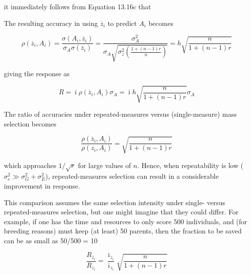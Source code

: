 \documentclass{article}
\begin{document}
it immediately follows from Equation 13.16c that

The resulting accuracy in using  $ \overline{z}_{i} $ to predict  $ A_{i} $ becomes

\begin{equation}
\rho(\overline{z}_{i},A_{i})=\frac{\sigma(A_{i},\overline{z}_{i})}{\sigma_{A}\sigma(\overline{z}_{i})}=\frac{\sigma_{A}^{2}}{\sigma_{A}\sqrt{\sigma_{z}^{2}\left(\frac{1+(n-1)r}{n}\right)}}=h\sqrt{\frac{n}{1+(n-1)r}}
\tag{13.18a}
\label{eq:13_18a}
\end{equation}

giving the response as

\begin{equation}
R=\bar{\imath}\rho(\overline{z}_{i},A_{i})\sigma_{A}=\bar{\imath}h\sqrt{\frac{n}{1+(n-1)r}}\sigma_{A}
\tag{13.18b}
\label{eq:13_18b}
\end{equation}

The ratio of accuracies under repeated-measures versus (single-measure) mass selection becomes

\begin{equation}
\frac{\rho(\overline{z}_{i},A_{i})}{\rho(z_{i},A_{i})}=\sqrt{\frac{n}{1+(n-1)r}}
\tag{13.19a}
\label{eq:13_19a}
\end{equation}

which approaches  $ 1/\sqrt{r} $ for large values of  $ n $. Hence, when repeatability is low ( $ \sigma_e^2 \gg \sigma_G^2 + \sigma_E^2 $), repeated-measures selection can result in a considerable improvement in response.

This comparison assumes the same selection intensity under single- versus repeated-measures selection, but one might imagine that they could differ. For example, if one has the time and resources to only score 500 individuals, and (for breeding reasons) must keep (at least) 50 parents, then the fraction to be saved can be as small as 50/500 = 10%

\begin{equation}
\frac{R_{\overline{z}_{i}}}{R_{z_{i}}}=\frac{\overline{\imath}_{\overline{z}_{i}}}{\overline{\imath}_{z_{i}}}\sqrt{\frac{n}{1+(n-1)r}}
\tag{13.19b}
\label{eq:13_19b}
\end{equation}
\end{document}
